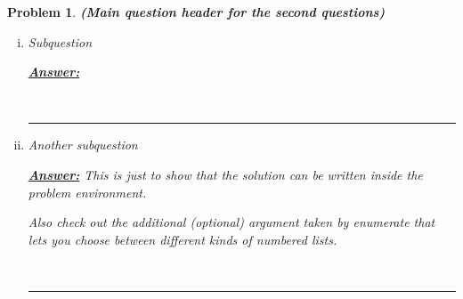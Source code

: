 \documentclass{article} %
\newtheorem{problem}[theorem]{Problem} %
\newenvironment{solution}[1][Answer]{\begin{singlespace}\underline{\textbf{#1:}}\quad }{\ \rule{0.3em}{0.3em}\end{singlespace}} %
\begin{document}
\begin{problem}
\normalfont
\textbf{(Main question header for the second questions)}

\noindent 
\begin{enumerate}[(i)]
    \item Subquestion
    \begin{solution}
    
    \end{solution}
    
    \item Another subquestion
    \begin{solution}
    This is just to show that the solution can be written inside the \textit{problem} environment.
    
    Also check out the additional (optional) argument taken by \textit{enumerate} that lets you choose between different kinds of numbered lists.
    
    \end{solution}
\end{enumerate}
\end{problem}
\end{document}
